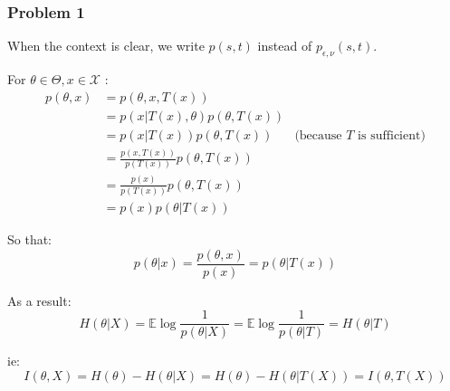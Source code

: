\documentclass[12pt]{article}
\newcommand{\Q}[1]{\subsubsection*{Problem #1}}
\begin{document}
\Q{1}
When the context is clear, we write $p(s,t)$ instead of $p_{\epsilon, \nu}(s,t)$.

For $\theta \in \Theta, x \in \mathcal X$ :
\begin{align*}
  p(\theta, x) &= p(\theta, x, T(x))
  \\&= p(x | T(x), \theta)p(\theta, T(x))
  \\&= p(x | T(x))p(\theta, T(x))& \text{(because $T$ is sufficient)}
  \\&= \frac{p(x, T(x))}{p(T(x))}p(\theta, T(x))
  \\&= \frac{p(x)}{p(T(x))} p(\theta, T(x))
  \\&= p(x) p(\theta | T(x))
\end{align*}

So that: 
$$p(\theta | x)  = \frac{p(\theta, x)}{p(x)} = p(\theta | T(x))$$

As a result:
$$H(\theta | X) = \mathbb E \log \frac1 {p(\theta | X)}  = \mathbb E \log \frac1 {p(\theta | T)}  = H(\theta | T)$$

ie:
$$I(\theta, X) = H(\theta) - H(\theta | X) = H(\theta) - H(\theta | T(X)) = I(\theta, T(X))$$
    
\end{document}
